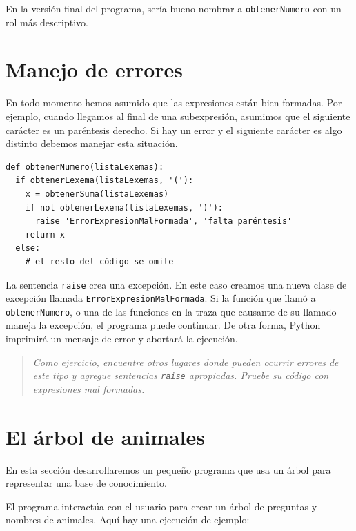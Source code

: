 En la versión final del programa, sería bueno nombrar a \texttt{obtenerNumero}
con un rol más descriptivo.

\section{Manejo de errores}

 

En todo momento hemos asumido que las expresiones están bien formadas.
Por ejemplo, cuando llegamos al final de una subexpresión, asumimos
que el siguiente carácter es un paréntesis derecho. Si hay un error
y el siguiente carácter es algo distinto debemos manejar esta situación.

\beforeverb 
\begin{verbatim}
def obtenerNumero(listaLexemas):
  if obtenerLexema(listaLexemas, '('):
    x = obtenerSuma(listaLexemas)       
    if not obtenerLexema(listaLexemas, ')'):
      raise 'ErrorExpresionMalFormada', 'falta paréntesis'
    return x
  else:
    # el resto del código se omite
\end{verbatim}
\afterverb La sentencia \texttt{raise} crea una excepción. En este
caso creamos una nueva clase de excepción llamada \texttt{ErrorExpresionMalFormada}.
Si la función que llamó a \texttt{obtenerNumero}, o una de las funciones
en la traza que causante de su llamado maneja la excepción, el programa
puede continuar. De otra forma, Python imprimirá un mensaje de error
y abortará la ejecución.
\begin{quote}
{\em Como ejercicio, encuentre otros lugares donde pueden ocurrir
errores de este tipo y agregue sentencias \texttt{raise} apropiadas.
Pruebe su código con expresiones mal formadas.} 
\end{quote}

\section{El árbol de animales}

  

En esta sección desarrollaremos un pequeño programa que usa un árbol
para representar una base de conocimiento.

El programa interactúa con el usuario para crear un árbol de preguntas
y nombres de animales. Aquí hay una ejecución de ejemplo:


